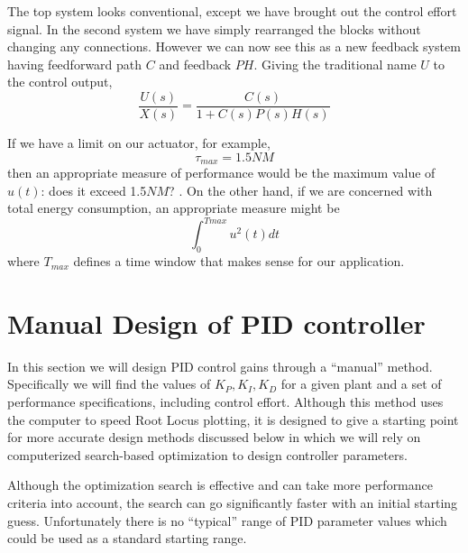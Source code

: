 The top system looks conventional, except we have brought out the control effort signal.   In the second system we have simply rearranged the blocks without changing any connections.   However we can now see this as a new feedback system having feedforward path $C$ and feedback $PH$.  Giving the traditional name  $U$ to the control output,	%
\[
\frac{U(s)}{X(s)} = \frac {C(s)}  {1+C(s)P(s)H(s)}
\]



If we have a limit on our actuator, for example,	%
\[
\tau_{max} = 1.5 NM
\]
then an appropriate measure of performance would be the maximum value of $u(t)$: does it exceed 1.5$NM$? .   On the other hand, if we are concerned with total energy consumption, an appropriate measure might be	%
\[
\int_0^{Tmax} u^2(t) dt
\]
where $T_{max}$ defines a time window that makes sense for our application.	%










\section{Manual Design of PID controller}

In this section we will design PID control gains through a ``manual'' method.  Specifically we will find the values of $K_P, K_I, K_D$ for a given plant and a set of performance specifications, including control effort.  Although this method uses the computer to speed Root Locus plotting, it is designed to give a starting point for more accurate design methods discussed below in which 
we will rely on computerized search-based optimization to design controller parameters.  

Although the optimization search is effective and can take more performance criteria into account, the search can go significantly faster with an initial starting guess.   Unfortunately there is no ``typical'' range of PID parameter values which could be used as a standard starting range.  

